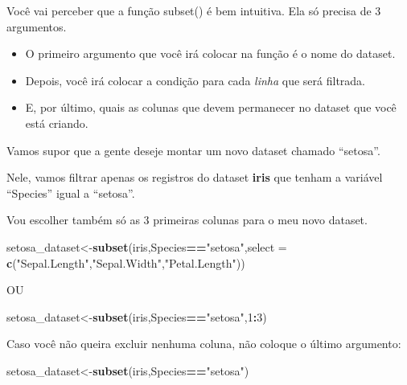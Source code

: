 \documentclass[
]{book}
\newenvironment{Shaded}{\begin{snugshade}}{\end{snugshade}}
\newcommand{\DataTypeTok}[1]{\textcolor[rgb]{0.13,0.29,0.53}{#1}}
\newcommand{\DecValTok}[1]{\textcolor[rgb]{0.00,0.00,0.81}{#1}}
\newcommand{\KeywordTok}[1]{\textcolor[rgb]{0.13,0.29,0.53}{\textbf{#1}}}
\newcommand{\NormalTok}[1]{#1}
\newcommand{\OperatorTok}[1]{\textcolor[rgb]{0.81,0.36,0.00}{\textbf{#1}}}
\newcommand{\StringTok}[1]{\textcolor[rgb]{0.31,0.60,0.02}{#1}}
\begin{document}
Você vai perceber que a função subset() é bem intuitiva. Ela só precisa
de 3 argumentos.

\begin{itemize}
\item
  O primeiro argumento que você irá colocar na função é o nome do
  dataset.
\item
  Depois, você irá colocar a condição para cada \emph{linha} que será
  filtrada.
\item
  E, por último, quais as colunas que devem permanecer no dataset que
  você está criando.
\end{itemize}

Vamos supor que a gente deseje montar um novo dataset chamado
``setosa''.

Nele, vamos filtrar apenas os registros do dataset \textbf{iris} que
tenham a variável ``Species'' igual a ``setosa''.

Vou escolher também só as 3 primeiras colunas para o meu novo dataset.

\begin{Shaded}
\begin{Highlighting}[]
\NormalTok{setosa_dataset<-}\KeywordTok{subset}\NormalTok{(iris,Species}\OperatorTok{==}\StringTok{"setosa"}\NormalTok{,}\DataTypeTok{select =} \KeywordTok{c}\NormalTok{(}\StringTok{"Sepal.Length"}\NormalTok{,}\StringTok{"Sepal.Width"}\NormalTok{,}\StringTok{"Petal.Length"}\NormalTok{))}
\end{Highlighting}
\end{Shaded}

OU

\begin{Shaded}
\begin{Highlighting}[]
\NormalTok{setosa_dataset<-}\KeywordTok{subset}\NormalTok{(iris,Species}\OperatorTok{==}\StringTok{"setosa"}\NormalTok{,}\DecValTok{1}\OperatorTok{:}\DecValTok{3}\NormalTok{)}
\end{Highlighting}
\end{Shaded}

Caso você não queira excluir nenhuma coluna, não coloque o último
argumento:

\begin{Shaded}
\begin{Highlighting}[]
\NormalTok{setosa_dataset<-}\KeywordTok{subset}\NormalTok{(iris,Species}\OperatorTok{==}\StringTok{"setosa"}\NormalTok{)}
\end{Highlighting}
\end{Shaded}
\end{document}

